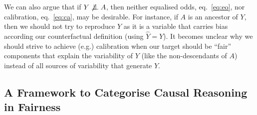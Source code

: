 \documentclass{article}
\newcommand{\cind}[0]{\mathrel{\text{\scalebox{1.07}{$\perp\mkern-10mu\perp$}}}}
\newcommand{\ncind}[0]{\mathrel{\text{\scalebox{1.07}{$\not\perp\mkern-10mu\perp$}}}}
\begin{document}
We can also argue that if $Y \ncind A$, then neither
equalised odds, eq.~\eqref{eq:eo}, nor calibration, eq.~\eqref{eq:ca}, may be desirable. For instance,
if $A$ is an ancestor of $Y$, then we should not try to reproduce
$Y$ as it is a variable that carries bias according our counterfactual
definition (using $\hat Y = Y$). It becomes unclear why we should
strive to achieve (e.g.) calibration when our target should be
``fair'' components that explain the variability of $Y$ (like the
non-descendants of $A$) instead of all sources of variability that
generate $Y$.


    


\subsection{A Framework to Categorise Causal Reasoning in Fairness}
\end{document}
